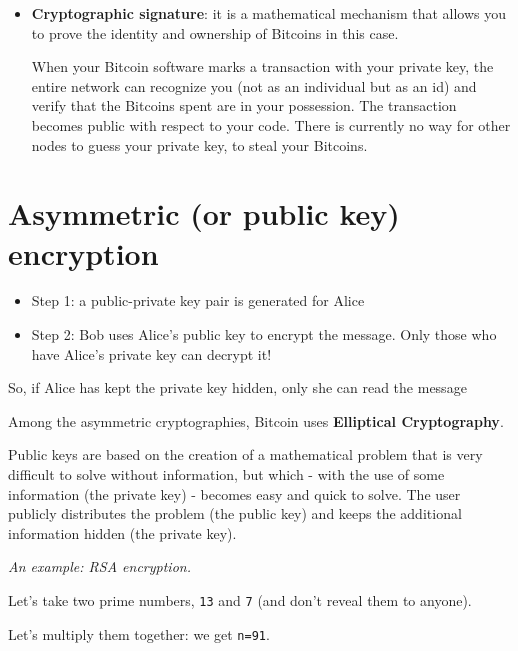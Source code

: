
\begin{itemize}
	\item \textbf{Cryptographic signature}: it is a mathematical mechanism that allows you to prove the identity and ownership of Bitcoins in this case.
	      
	      When your Bitcoin software marks a transaction with your private key, the entire network can recognize you (not as an individual but as an id) and verify that the Bitcoins spent are in your possession. The transaction becomes public with respect to your code. There is currently no way for other nodes to guess your private key, to steal your Bitcoins.
\end{itemize}


\section{Asymmetric (or public key) encryption}

\begin{itemize}
	\item Step 1: a public-private key pair is generated for Alice
	\item Step 2: Bob uses Alice's public key to encrypt the message. Only those who have Alice's private key can decrypt it!
\end{itemize}

So, if Alice has kept the private key hidden, only she can read the message


Among the asymmetric cryptographies, Bitcoin uses \textbf{Elliptical Cryptography}.

Public keys are based on the creation of a mathematical problem that is very difficult to solve without information, but which - with the use of some information (the private key) - becomes easy and quick to solve. The user publicly distributes the problem (the public key) and keeps the additional information hidden (the private key).

\textit{An example: RSA encryption.}

Let's take two prime numbers, \texttt{13} and \texttt{7} (and don't reveal them to anyone).

Let's multiply them together: we get \texttt{n=91}.


